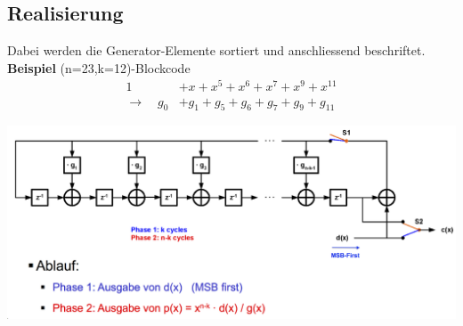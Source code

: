 \subsection{Realisierung}
Dabei werden die Generator-Elemente sortiert und anschliessend beschriftet. \textbf{Beispiel} (n=23,k=12)-Blockcode
\begin{align*}
	 1 &+ x + x^5 +x^6 + x^7 + x^9 + x^{11}\\
	\rightarrow \quad g_0 &+ g_1 + g_5 + g_6 +g_7 + g_9 + g_{11}
\end{align*}
\begin{center}
	\includegraphics[width=\columnwidth]{Images/realisierung}
\end{center}
